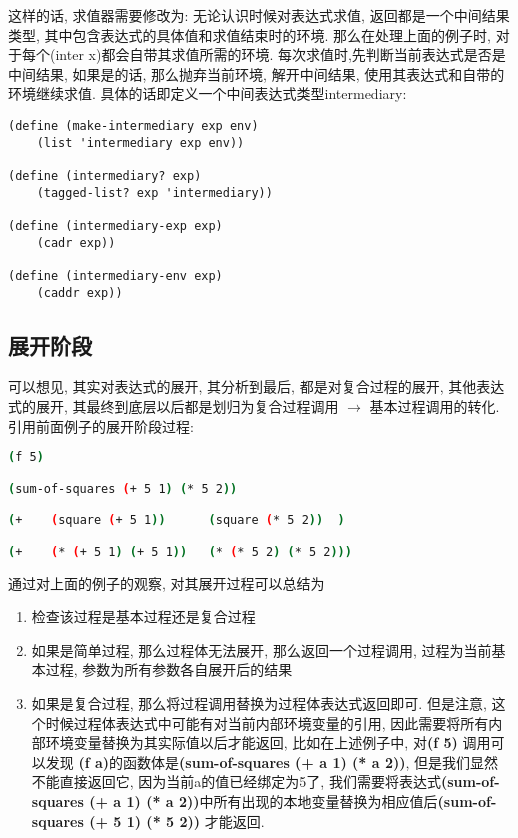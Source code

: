 \documentclass{article}
\begin{document}
\begin{CJK*}{UTF8}{gkai}
这样的话, 求值器需要修改为: 无论认识时候对表达式求值, 返回都是一个中间结果类型, 其中包含表达式的具体值和求值结束时的环境. 那么在处理上面的例子时, 对于每个(inter x)都会自带其求值所需的环境. 每次求值时,先判断当前表达式是否是中间结果, 如果是的话, 那么抛弃当前环境, 解开中间结果, 使用其表达式和自带的环境继续求值. 具体的话即定义一个中间表达式类型intermediary:

\begin{lstlisting}
(define (make-intermediary exp env)
    (list 'intermediary exp env))

(define (intermediary? exp)
    (tagged-list? exp 'intermediary))

(define (intermediary-exp exp)
    (cadr exp))

(define (intermediary-env exp)
    (caddr exp))
\end{lstlisting}

\subsection{展开阶段}

可以想见, 其实对表达式的展开, 其分析到最后, 都是对复合过程的展开, 其他表达式的展开, 其最终到底层以后都是划归为复合过程调用 $\rightarrow$ 基本过程调用的转化. 引用前面例子的展开阶段过程:

\begin{lstlisting}[language=bash, numbers=none, basicstyle=\footnotesize\color{green}\ttfamily\bfseries, backgroundcolor=\color{black}]
(f 5)

(sum-of-squares (+ 5 1) (* 5 2))

(+    (square (+ 5 1))      (square (* 5 2))  )

(+    (* (+ 5 1) (+ 5 1))   (* (* 5 2) (* 5 2)))
\end{lstlisting}

通过对上面的例子的观察, 对其展开过程可以总结为

\begin{enumerate}
    \item 检查该过程是基本过程还是复合过程
    \item 如果是简单过程, 那么过程体无法展开, 那么返回一个过程调用, 过程为当前基本过程, 参数为所有参数各自展开后的结果
    \item 如果是复合过程, 那么将过程调用替换为过程体表达式返回即可. 但是注意, 这个时候过程体表达式中可能有对当前内部环境变量的引用, 因此需要将所有内部环境变量替换为其实际值以后才能返回, 比如在上述例子中, 对{\bfseries \ttfamily (f 5)} 调用可以发现 {\bfseries \ttfamily (f a)}的函数体是{\bfseries \ttfamily (sum-of-squares (+ a 1) (* a 2))}, 但是我们显然不能直接返回它, 因为当前a的值已经绑定为5了, 我们需要将表达式{\bfseries \ttfamily (sum-of-squares (+ a 1) (* a 2))}中所有出现的本地变量替换为相应值后{\bfseries \ttfamily (sum-of-squares (+ 5 1) (* 5 2))} 才能返回.
\end{enumerate}


\end{CJK*}
\end{document}
